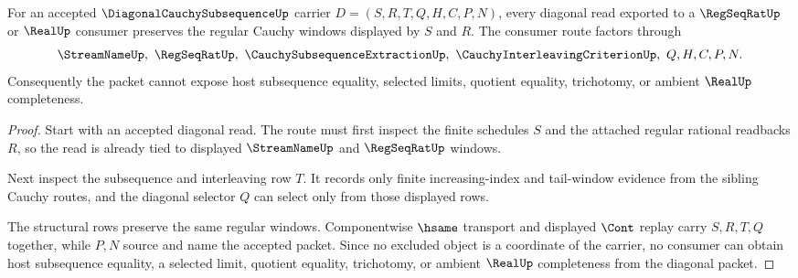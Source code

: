\begin{theorem}
\label{thm:diagonal-cauchy-subsequence-regularity}
For an accepted $\DiagonalCauchySubsequenceUp$ carrier $D=(S,R,T,Q,H,C,P,N)$, every diagonal read exported to a $\RegSeqRatUp$ or $\RealUp$ consumer preserves the regular Cauchy windows displayed by $S$ and $R$. The consumer route factors through
$$
\StreamNameUp,\ \RegSeqRatUp,\ \CauchySubsequenceExtractionUp,\ \CauchyInterleavingCriterionUp,\ Q,H,C,P,N .
$$
Consequently the packet cannot expose host subsequence equality, selected limits, quotient equality, trichotomy, or ambient $\RealUp$ completeness.
\end{theorem}
\begin{proof}
Start with an accepted diagonal read. The route must first inspect the finite schedules $S$ and the attached regular rational readbacks $R$, so the read is already tied to displayed $\StreamNameUp$ and $\RegSeqRatUp$ windows.

Next inspect the subsequence and interleaving row $T$. It records only finite increasing-index and tail-window evidence from the sibling Cauchy routes, and the diagonal selector $Q$ can select only from those displayed rows.

The structural rows preserve the same regular windows. Componentwise $\hsame$ transport and displayed $\Cont$ replay carry $S,R,T,Q$ together, while $P,N$ source and name the accepted packet. Since no excluded object is a coordinate of the carrier, no consumer can obtain host subsequence equality, a selected limit, quotient equality, trichotomy, or ambient $\RealUp$ completeness from the diagonal packet.
\end{proof}




